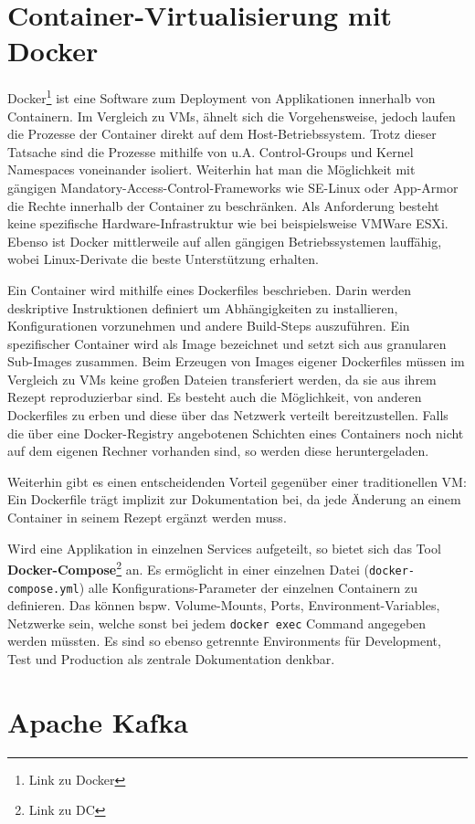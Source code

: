 \section{Container-Virtualisierung mit Docker}
Docker\footnote{Link zu Docker} ist eine Software zum Deployment von Applikationen innerhalb von Containern.
Im Vergleich zu \acp{VM}, ähnelt sich die Vorgehensweise, jedoch laufen die Prozesse der Container direkt auf dem Host-Betriebssystem.
Trotz dieser Tatsache sind die Prozesse mithilfe von \ac{u.A.} Control-Groups und Kernel Namespaces voneinander isoliert.
Weiterhin hat man die Möglichkeit mit gängigen Mandatory-Access-Control-Frameworks wie SE-Linux oder App-Armor die Rechte innerhalb der Container zu beschränken.
Als Anforderung besteht keine spezifische Hardware-Infrastruktur wie bei beispielsweise VMWare ESXi.
Ebenso ist Docker mittlerweile auf allen gängigen Betriebssystemen lauffähig, wobei Linux-Derivate die beste Unterstützung erhalten.
\par
Ein Container wird mithilfe eines Dockerfiles beschrieben.
Darin werden deskriptive Instruktionen definiert um Abhängigkeiten zu installieren, Konfigurationen vorzunehmen und andere Build-Steps auszuführen.
Ein spezifischer Container wird als Image bezeichnet und setzt sich aus granularen Sub-Images zusammen.
Beim Erzeugen von Images eigener Dockerfiles müssen im Vergleich zu \acp{VM} keine großen Dateien transferiert werden, da sie aus ihrem Rezept reproduzierbar sind. 
Es besteht auch die Möglichkeit, von anderen Dockerfiles zu erben und diese über das Netzwerk verteilt bereitzustellen.
Falls die über eine Docker-Registry angebotenen Schichten eines Containers noch nicht auf dem eigenen Rechner vorhanden sind, so werden diese heruntergeladen.
\par
Weiterhin gibt es einen entscheidenden Vorteil gegenüber einer traditionellen \ac{VM}: Ein Dockerfile trägt implizit zur Dokumentation bei, da jede Änderung an einem Container in seinem Rezept ergänzt werden muss.
\par
Wird eine Applikation in einzelnen Services aufgeteilt, so bietet sich das Tool \textbf{Docker-Compose}\footnote{Link zu DC} an.
Es ermöglicht in einer einzelnen Datei (\texttt{docker-compose.yml}) alle Konfigurations-Parameter der einzelnen Containern zu definieren.
Das können \ac{bspw.} Volume-Mounts, Ports, Environment-Variables, Netzwerke sein, welche sonst bei jedem \texttt{docker exec} Command angegeben werden müssten.
Es sind so ebenso getrennte Environments für Development, Test und Production als zentrale Dokumentation denkbar.

\section{Apache Kafka}

